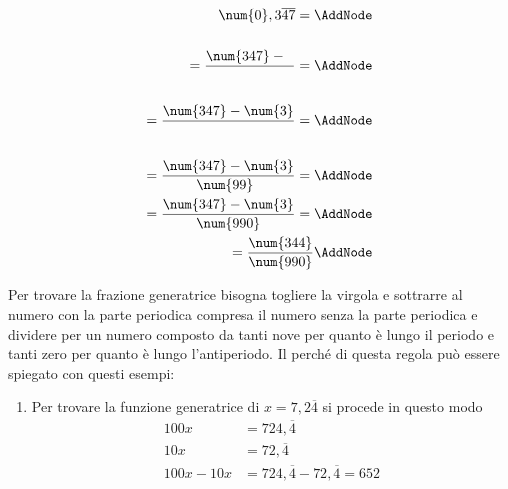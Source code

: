 \begin{enumerate}
\begin{NodesList}
	\centering
	\begin{align*}
	\num{0},3\overline{47}=\AddNode\\[.5cm] 
	=\dfrac{\num{347} -\phantom{3}}{\phantom{99}}=\AddNode\\[.5cm] %
	=\dfrac{\num{347}-\num{3}}{\phantom{99}}=\AddNode\\[.5cm]
	=\dfrac{\num{347}-\num{3}}{\num{99}\phantom{0}}=\AddNode\\
	=\dfrac{\num{347}-\num{3}}{\num{990}}=\AddNode\\
	=\dfrac{\num{344}}{\num{990}}\AddNode
	\end{align*}
	\end{NodesList}
	Per trovare la frazione generatrice bisogna togliere la virgola e sottrarre al numero con la parte periodica compresa il numero senza la parte periodica e dividere per un numero composto da tanti nove per quanto è lungo il periodo e tanti zero per quanto è lungo l'antiperiodo. Il perché di questa regola può essere spiegato con questi esempi:
	\begin{enumerate}
		\item Per trovare la funzione generatrice di $x=7{,}2\overline{4}$ si procede in questo modo
		\begin{align*}
		100x &=724{,}\overline{4}\\
		10x &=72{,}\overline{4}\\
		100x-10x&=724{,}\overline{4}-72{,}\overline{4}=652\\

\end{align*}
\end{enumerate}
\end{enumerate}
